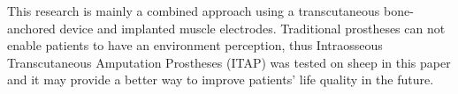 This research is mainly a combined approach using a transcutaneous bone-anchored device and implanted muscle electrodes. Traditional prostheses can not enable patients to have an environment perception, thus Intraosseous Transcutaneous Amputation Prostheses (ITAP) was tested on sheep in this paper and it may provide a better way to improve patients' life quality in the future.